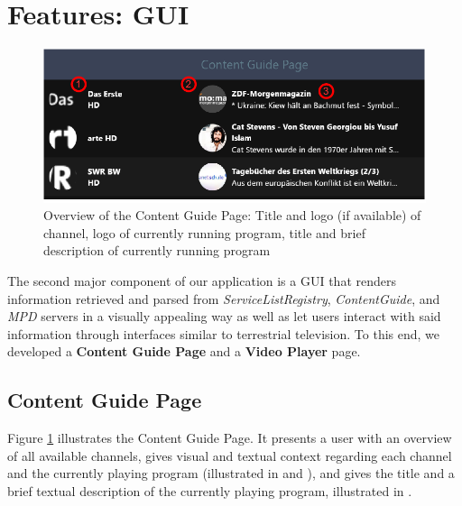 \documentclass[conference]{IEEEtran}
\begin{document}

\section{Features: GUI}\label{dvbi_parser}
\begin{figure}[h]
	\centerline{\includegraphics[width=\linewidth]{figures/ContentGuidePage}}
	\caption{Overview of the Content Guide Page:  Title and logo (if available) of channel,  logo of currently running program,  title and brief description of currently running program}
	\label{fig:contentGuidePage}
\end{figure}

The second major component of our application is a GUI that renders information retrieved and parsed from \textit{ServiceListRegistry}, \textit{ContentGuide}, and \textit{MPD} servers in a visually appealing way as well as let users interact with said information through interfaces similar to terrestrial television. To this end, we developed a \textbf{Content Guide Page} and a \textbf{Video Player} page.

\subsection{Content Guide Page}
Figure \ref{fig:contentGuidePage} illustrates the Content Guide Page. It presents a user with an overview of all available channels, gives visual and textual context regarding each channel and the currently playing program (illustrated in  and ), and  gives the title and a brief textual description of the currently playing program, illustrated in . \\\par
\end{document}
